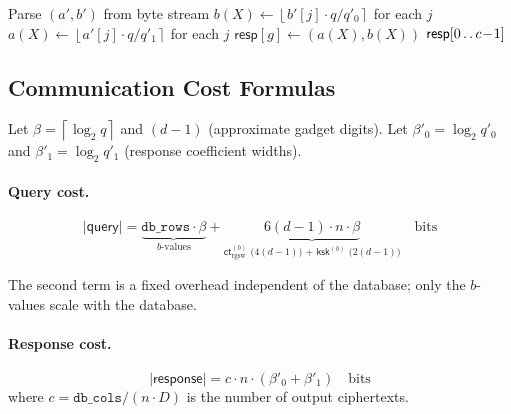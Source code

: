 \documentclass[11pt,a4paper]{article}
\newcommand{\Z}{\mathbb{Z}}
\newcommand{\ceil}[1]{\left\lceil #1 \right\rceil}
\newcommand{\round}[1]{\left\lfloor #1 \right\rceil}
\begin{document}
\begin{algorithm}[H]
\caption{$\textsc{DeserializeResponse}(\texttt{bytes})$: Client-side, applied before $\textsc{Extract}$.}
\label{alg:deserialize-response}
\begin{algorithmic}[1]
    \State Parse $(a', b')$ from byte stream
    \State $b(X) \gets \round{b'[j] \cdot q / q'_0}$ for each $j$ \Comment{rescale back to $\Z_q$}
    \State $a(X) \gets \round{a'[j] \cdot q / q'_1}$ for each $j$
    \State $\mathsf{resp}[g] \gets (a(X), b(X))$
\EndFor
\State \Return $\mathsf{resp}[0 \mathinner{.\,.} c\!-\!1]$
\end{algorithmic}
\end{algorithm}

\subsection{Communication Cost Formulas}\label{sec:comm-cost}

Let $\beta = \ceil{\log_2 q}$ and $(d-1)$ (approximate gadget digits).
Let $\beta'_0 = \log_2 q'_0$ and $\beta'_1 = \log_2 q'_1$ (response coefficient widths).

\paragraph{Query cost.}
\begin{equation}
    |\mathsf{query}| = \underbrace{\texttt{db\_rows} \cdot \beta}_{\text{$b$-values}} + \underbrace{6(d\!-\!1) \cdot n \cdot \beta}_{\text{$\mathsf{ct}_{\mathrm{rgsw}}^{(b)}$ ($4(d\!-\!1)$) + $\mathsf{ksk}^{(b)}$ ($2(d\!-\!1)$)}} \quad \text{bits}
    \label{eq:query-cost}
\end{equation}

The second term is a fixed overhead independent of the database; only the $b$-values scale with the database.

\paragraph{Response cost.}
\begin{equation}
    |\mathsf{response}| = c \cdot n \cdot (\beta'_0 + \beta'_1) \quad \text{bits}
    \label{eq:response-cost}
\end{equation}
where $c = \texttt{db\_cols} / (n \cdot D)$ is the number of output ciphertexts.
\end{document}
